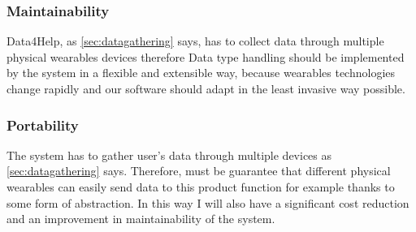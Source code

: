     \subsubsection{Maintainability}

      Data4Help, as \ref{sec:datagathering} says, has to collect data through multiple physical wearables devices therefore Data type handling should be implemented by the system in a flexible and extensible way, because wearables technologies change rapidly and our software should adapt in the least invasive way possible.

    \subsubsection{Portability}

      The system has to gather user's data through multiple devices as \ref{sec:datagathering} says. Therefore, must be guarantee that different physical wearables can easily send data to this product function for example thanks to some form of abstraction. In this way I will also have a significant cost reduction and an improvement in maintainability of the system.
